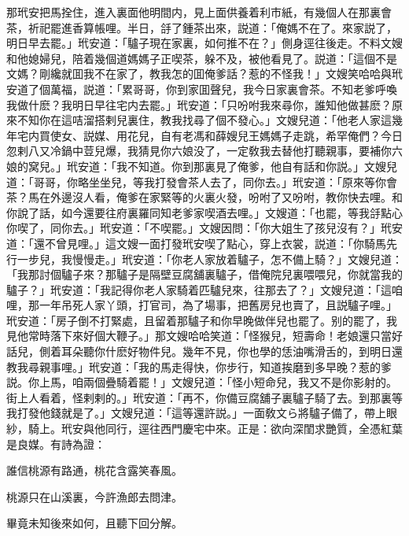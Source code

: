 那玳安把馬拴住，進入裏面他明間内，見上面供養着利市紙，有幾個人在那裏會茶，祈祀罷進香算帳哩。半日，㧱了鍾茶出來，説道：「俺媽不在了。來家説了，明日早去罷。」玳安道：「驢子現在家裏，如何推不在？」側身逕往後走。不料文嫂和他媳婦兒，陪着幾個道媽媽子正喫茶，躲不及，被他看見了。説道：「這個不是文媽？剛纔就囬我不在家了，教我怎的囬俺爹話？惹的不怪我！」文嫂笑哈哈與玳安道了個萬福，説道：「累哥哥，你到家囬聲兒，我今日家裏會茶。不知老爹呼喚我做什麽？我明日早往宅内去罷。」玳安道：「只吩咐我來尋你，誰知他做甚麽？原來不知你在這咭溜搭剌兒裏住，教我找尋了個不發心。」文嫂兒道：「他老人家這幾年宅内買使女、説媒、用花兒，自有老馮和薛嫂兒王媽媽子走跳，希罕俺們？今日忽剌八又冷鍋中荳兒爆，我猜見你六娘没了，一定敎我去替他打聽親事，要補你六娘的窝兒。」玳安道：「我不知道。你到那裏見了俺爹，他自有話和你説。」文嫂兒道：「哥哥，你略坐坐兒，等我打發會茶人去了，同你去。」玳安道：「原來等你會茶？馬在外邊沒人看，俺爹在家緊等的火裏火發，吩咐了又吩咐，教你快去哩。和你說了話，如今還要往府裏羅同知老爹家喫酒去哩。」文嫂道：「也罷，等我㧱點心你喫了，同你去。」玳安道：「不喫罷。」文嫂因問：「你大姐生了孩兒沒有？」玳安道：「還不曾見哩。」這文嫂一面打發玳安喫了點心，穿上衣裳，説道：「你騎馬先行一步兒，我慢慢走。」玳安道：「你老人家放着驢子，怎不備上騎？」文嫂兒道：「我那討個驢子來？那驢子是隔壁豆腐舖裏驢子，借俺院兒裏喂喂兒，你就當我的驢子？」玳安道：「我記得你老人家騎着匹驢兒來，往那去了？」文嫂兒道：「這咱哩，那一年吊死人家丫頭，打官司，為了場事，把舊房兒也賣了，且説驢子哩。」玳安道：「房子倒不打緊處，且留着那驢子和你早晚做伴兒也罷了。别的罷了，我見他常時落下來好個大鞭子。」那文嫂哈哈笑道：「怪猴兒，短壽命！老娘還只當好話兒，側着耳朵聽你什麽好物件兒。幾年不見，你也學的恁油嘴滑舌的，到明日還教我尋親事哩。」玳安道：「我的馬走得快，你步行，知道挨磨到多早晚？惹的爹説。你上馬，咱兩個疊騎着罷！」文嫂兒道：「怪小短命兒，我又不是你影射的。街上人看着，怪剌剌的。」玳安道：「再不，你備豆腐舖子裏驢子騎了去。到那裏等我打發他錢就是了。」文嫂兒道：「這等還許説。」一面敎文ら將驢子備了，帶上眼紗，騎上。玳安與他同行，逕往西門慶宅中來。正是：欲向深閨求艷質，全憑紅葉是良媒。有詩為證：

\begin{myquote}
誰信桃源有路通，桃花含露笑春風。

桃源只在山溪裏，今許漁郎去問津。
\end{myquote}

畢竟未知後來如何，且聽下回分解。

